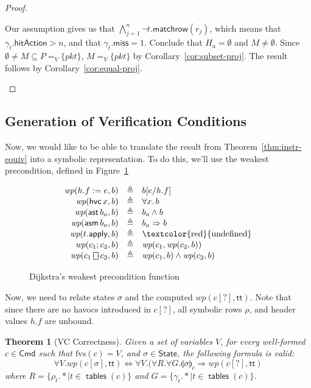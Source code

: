 \documentclass{article}
\newcommand{\pkt}{\mathit{pkt}}
\newcommand{\TRUE}{\mathsf{tt}}
\newcommand{\Cmd}{\mathsf{Cmd}}
\newcommand{\State}{\mathsf{State}}
\newcommand{\hitAction}{\mathsf{hitAction}}
\newcommand{\miss}{\mathsf{miss}}
\newcommand{\assert}{\mathop{\mathsf{ast}}}
\newcommand{\assume}{\mathop{\mathsf{asm}}}
\newcommand{\apply}{\mathsf{apply}}
\newcommand{\choiceop}{\rotatebox[origin=c]{90}{$\sqsubset\!\!\!\sqsupset$}}
\newcommand{\choice}{\mathbin{\choiceop}}
\newcommand{\havoc}[1]{\mathop{\mathsf{hvc}}#1}
\newcommand{\WP}{\textit{wp}}
\newcommand{\state}[1]{\llparenthesis#1\rrparenthesis}
\newcommand{\instr}{[?]}
\newcommand{\fvs}{\textrm{fvs}}
\newcommand{\matchrow}{\mathsf{matchrow}}
\newcommand{\tables}{\mathop{\mathsf{tables}}}
\theoremstyle{plain}
\newtheorem{theorem}{Theorem}
\theoremstyle{definition}
\theoremstyle{remark}
\begin{document}
\begin{proof}
\begin{enumerate}[align=left]
\begin{enumerate}
        Our assumption gives us that $\bigwedge_{j=1}^n \neg t.\matchrow(r_j)$,
        which means that $\gamma_t.\hitAction > n$, and that $\gamma_t.\miss =
        1$. Conclude that $H_a = \emptyset$ and $M \neq \emptyset$. Since
        $\emptyset \neq M \subseteq P =_V \{\pkt\}$, $M =_V \{\pkt\}$ by
        Corollary~\ref{cor:subset-proj}. The result follows by
        Corollary~\ref{cor:equal-proj}.
    \end{enumerate}

  \end{enumerate}
\end{proof}

\subsection{Generation of Verification Conditions}

Now, we would like to be able to translate the result from
Theorem~\ref{thm:instr-equiv} into a symbolic representation. To do this, we'll
use the weakest precondition, defined in Figure~\ref{fig:wp}

\begin{figure}[H]
  \[
  \begin{array}{r >{\triangleq}c l}
    \WP(h.f := e, b)
    && b[e/h.f] \\
    \WP(\havoc x, b)
    && \forall x.\,b \\
    \WP(\assert b_a, b)
    && b_a \wedge b \\
    \WP(\assume b_a, b)
    && b_a \Rightarrow b \\
    \WP(t.\apply,b) && \textrm{\textcolor{red}{undefined}} \\
    \WP(c_1;c_2, b)
    && \WP(c_1,\WP(c_2,b)) \\
    \WP(c_1 \choice c_2, b)
    && \WP(c_1,b) \wedge \WP(c_2,b)
  \end{array}
  \]
  \caption{Dijkstra's weakest precondition function}
  \label{fig:wp}
\end{figure}

Now, we need to relate states $\sigma$ and the computed $\WP(c\instr,\TRUE)$.
Note that since there are no havocs introduced in $c\instr$, all symbolic rows
$\rho$, and header values $h.f$ are unbound.

\begin{theorem}[VC Correctness]
  \label{thm:vc-correct}
  Given a set of variables $V$, for every well-formed $c \in \Cmd$ such that $\fvs(c) = V$,
  and $\sigma \in \State$, the following formula is valid:
  \[ \forall V. \WP(c[\sigma], \TRUE) \iff \forall V. (\forall R. \forall G. \state\sigma_c \Rightarrow  \WP(c\instr,\TRUE)\]
  where $R = \{\rho_t.* \mid t \in \tables(c)\}$ and $G = \{\gamma_t.*\mid t \in \tables (c)\}$.
\end{theorem}
\end{document}

